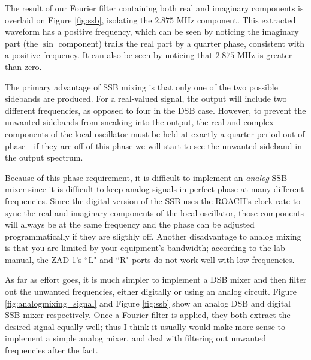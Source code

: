 \documentclass[12pt]{article}
\begin{document}
The result of our Fourier filter containing both real and imaginary components is overlaid on Figure \ref{fig:ssb}, isolating the $2.875$ MHz component. This extracted waveform has a positive frequency, which can be seen by noticing the imaginary part (the $\sin$ component) trails the real part by a quarter phase, consistent with a positive frequency. It can also be seen by noticing that $2.875$ MHz is greater than zero.

The primary advantage of SSB mixing is that only one of the two possible sidebands are produced. For a real-valued signal, the output will include two different frequencies, as opposed to four in the DSB case. However, to prevent the unwanted sidebands from sneaking into the output, the real and complex components of the local oscillator must be held at exactly a quarter period out of phase---if they are off of this phase we will start to see the unwanted sideband in the output spectrum.

Because of this phase requirement, it is difficult to implement an \textit{analog} SSB mixer since it is difficult to keep analog signals in perfect phase at many different frequencies. Since the digital version of the SSB uses the ROACH's clock rate to sync the real and imaginary components of the local oscillator, those components will always be at the same frequency and the phase can be adjusted programmatically if they are sligthly off. Another disadvantage to analog mixing is that you are limited by your equipment's bandwidth; according to the lab manual, the ZAD-1's ``L" and ``R" ports do not work well with low frequencies.

As far as effort goes, it is much simpler to implement a DSB mixer and then filter out the unwanted frequencies, either digitally or using an analog circuit. Figure \ref{fig:analogmixing_signal} and Figure \ref{fig:ssb} show an analog DSB and digital SSB mixer respectively. Once a Fourier filter is applied, they both extract the desired signal equally well; thus I think it usually would make more sense to implement a simple analog mixer, and deal with filtering out unwanted frequencies after the fact.
\end{document}
